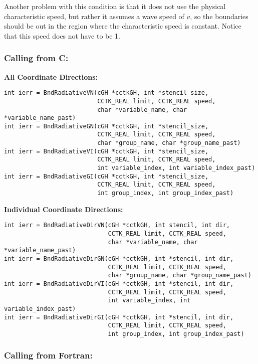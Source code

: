 \documentclass{article}
\begin{document}
Another problem with this condition is that it does not
use the physical characteristic speed, but rather it assumes
a wave speed of $v$, so the boundaries should be out in
the region where the characteristic speed is constant.
Notice that this speed does not have to be 1.  

\subsubsection*{Calling from C:}

{\bf All Coordinate Directions:}
\begin{verbatim}
int ierr = BndRadiativeVN(cGH *cctkGH, int *stencil_size, 
                          CCTK_REAL limit, CCTK_REAL speed, 
                          char *variable_name, char *variable_name_past)
int ierr = BndRadiativeGN(cGH *cctkGH, int *stencil_size, 
                          CCTK_REAL limit, CCTK_REAL speed,  
                          char *group_name, char *group_name_past)
int ierr = BndRadiativeVI(cGH *cctkGH, int *stencil_size, 
                          CCTK_REAL limit, CCTK_REAL speed,  
                          int variable_index, int variable_index_past)
int ierr = BndRadiativeGI(cGH *cctkGH, int *stencil_size, 
                          CCTK_REAL limit, CCTK_REAL speed,  
                          int group_index, int group_index_past)
\end{verbatim}

{\bf Individual Coordinate Directions:}
\begin{verbatim}
int ierr = BndRadiativeDirVN(cGH *cctkGH, int stencil, int dir,
                             CCTK_REAL limit, CCTK_REAL speed, 
                             char *variable_name, char *variable_name_past)
int ierr = BndRadiativeDirGN(cGH *cctkGH, int *stencil, int dir, 
                             CCTK_REAL limit, CCTK_REAL speed,  
                             char *group_name, char *group_name_past)
int ierr = BndRadiativeDirVI(cGH *cctkGH, int *stencil, int dir, 
                             CCTK_REAL limit, CCTK_REAL speed,  
                             int variable_index, int variable_index_past)
int ierr = BndRadiativeDirGI(cGH *cctkGH, int *stencil, int dir, 
                             CCTK_REAL limit, CCTK_REAL speed,  
                             int group_index, int group_index_past)
\end{verbatim}

\subsubsection*{Calling from Fortran:}
\end{document}
